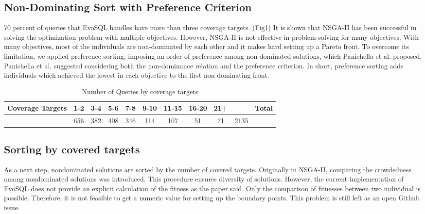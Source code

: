 \subsection{Non-Dominating Sort with Preference Criterion}
70 percent of queries that EvoSQL handles have more than three coverage targets. (Fig1) It is shown that NSGA-II has been successful in solving the optimization problem with multiple objectives. However, NSGA-II is not effective in problem-solving for many objectives. With many objectives, most of the individuals are non-dominated by each other and it makes hard setting up a Pareto front. To overcome its limitation, we applied preference sorting, imposing an order of preference among non-dominated solutions, which Panichella et al. proposed. Panichella et al. suggested considering both the non-dominance relation and the preference criterion. In short, preference sorting adds individuals which achieved the lowest in each objective to the first non-dominating front.  

\begin{table}
	\centering
	\label{tbl:num_of_coverage_targets}
	
	\begin{tabular}{c|c|c|c|c|c|c|c|c|cr}
		Coverage Targets & 1-2 & 3-4 & 5-6 & 7-8 & 9-10 & 11-15 & 16-20 & 21+ && Total \\ 
		\hline
		 & 656 & 382 & 408 & 346 & 114  & 107   & 51    & 71  & 2135
	\end{tabular} 
	\caption{Number of Queries by coverage targets}
\end{table}

\subsection{Sorting by covered targets}
As a next step, nondominated solutions are sorted by the number of covered targets. Originally in NSGA-II, comparing the crowdedness among nondominated solutions was introduced. This procedure ensures diversity of solutions. However, the current implementation of EvoSQL does not provide an explicit calculation of the fitness as the paper said. Only the comparison of fitnesses between two individual is possible. Therefore, it is not feasible to get a numeric value for setting up the boundary points. This problem is still left as an open Github issue.